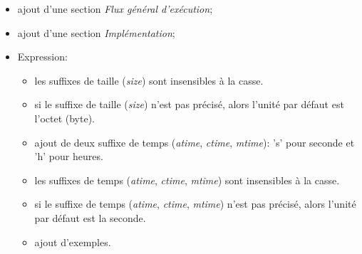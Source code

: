 \documentclass[11pt, a4paper]{article}
\begin{document}
\begin{itemize}
    \item ajout d'une section \textit{Flux général d'exécution};
    \item ajout d'une section \textit{Implémentation};
    \item Expression:
    \begin{itemize}
        \item les suffixes de taille (\textit{size}) sont insensibles à la casse.
        \item si le suffixe de taille (\textit{size}) n'est pas précisé, alors l'unité par défaut est l'octet (byte).
        \item ajout de deux suffixe de temps (\textit{atime}, \textit{ctime}, \textit{mtime}): 's' pour seconde et 'h' pour heures.
        \item les suffixes de temps (\textit{atime}, \textit{ctime}, \textit{mtime}) sont insensibles à la casse.
        \item si le suffixe de temps (\textit{atime}, \textit{ctime}, \textit{mtime}) n'est pas précisé, alors l'unité par défaut est la seconde.
        \item ajout d'exemples.
    \end{itemize}
\end{itemize}
\end{document}
